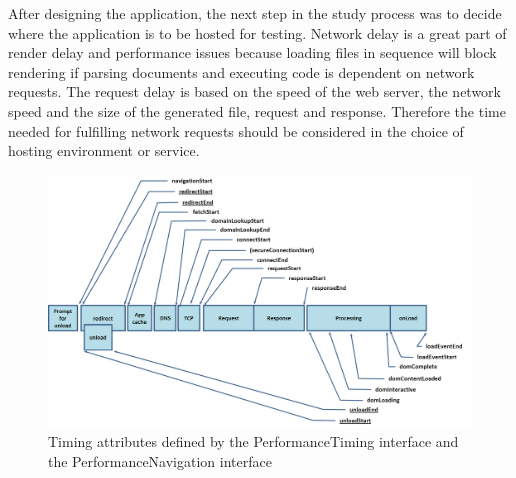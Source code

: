 \documentclass[a4paper, 12pt]{article}
\begin{document}
After designing the application, the next step in the study process was to decide where the application is to be hosted for testing.
Network delay is a great part of render delay and performance issues \citep{highperformancebrowsernetworking} because loading files in sequence will block rendering if parsing documents and executing code is dependent on network requests.
The request delay is based on the speed of the web server, the network speed and the size of the generated file, request and response.
Therefore the time needed for fulfilling network requests should be considered in the choice of hosting environment or service.

\begin{figure}[h]
  \begin{center}
    \includegraphics[width=\linewidth]{img/request-timing.png}
  \end{center}
  \caption{Timing attributes defined by the PerformanceTiming interface and the PerformanceNavigation interface \citep{navigationTimings}}\label{fig:timing}
\end{figure}
\end{document}
